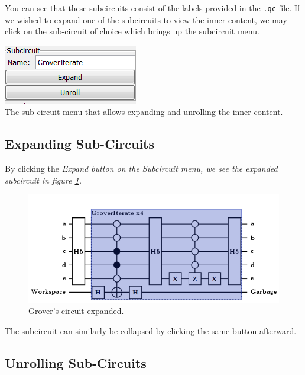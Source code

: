 \documentclass[10pt]{article}
\theoremstyle{definition}
\begin{document}
You can see that these subcircuits consist of the labels provided in the \verb+.qc+ file. If we wished to expand one of the subcircuits to view the inner content, we may click on the sub-circuit of choice which brings up the subcircuit menu.

\begin{center}
\includegraphics{Figures/SubCircuits/SubCircuitMenu.png} \\
The sub-circuit menu that allows expanding and unrolling the inner content.
\end{center}

\subsection{Expanding Sub-Circuits}\label{sec:ExpandingSubCircuits}

By clicking the \em Expand \em button on the \em Subcircuit \em menu, we see the expanded subcircuit in figure \ref{f:groverex}.

\begin{figure}
\capstart
\centering
\includegraphics[scale=.5]{Figures/SubCircuits/GroverCircuitExpand}
\caption{Grover's circuit expanded.}
\label{f:groverex}
\end{figure}

The subcircuit can similarly be collapsed by clicking the same button afterward.


\subsection{Unrolling Sub-Circuits}\label{sec:UnrollingSubCircuits}
\end{document}
